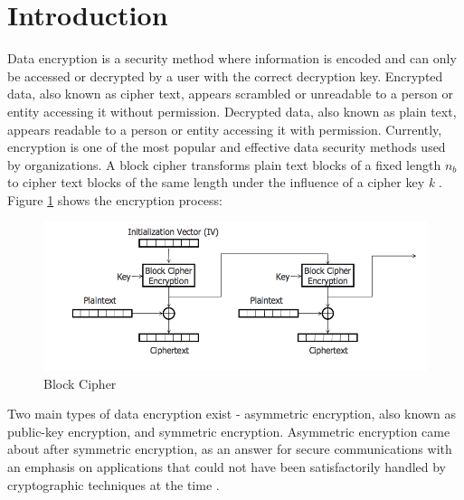 \documentclass[journal]{IEEEtran}
\begin{document}
\section{\textbf{Introduction}}
Data encryption is a security method where information is encoded and can only be accessed or decrypted by a user with the correct decryption key. Encrypted data, also known as cipher text, appears scrambled or unreadable to a person or entity accessing it without permission. Decrypted data, also known as plain text, appears readable to a person or entity accessing it with permission. Currently, encryption is one of the most popular and effective data security methods used by organizations. A block cipher transforms plain text blocks of a fixed length \textit{${n_b}$} to cipher text blocks of the same length under the influence of a cipher key \textit{k} \cite{block_cipher}. Figure \ref{fig:block_cipher} shows the encryption process:

\newline
\begin{figure}[!hb]
    \centering
    \includegraphics[scale=.3]{block_cipher}
    \caption{Block Cipher}
    \label{fig:block_cipher}
\end{figure}

Two main types of data encryption exist - asymmetric encryption, also known as public-key encryption, and symmetric encryption. Asymmetric encryption came about after symmetric encryption, as an answer for secure communications with an emphasis on applications that could not have been satisfactorily handled by cryptographic techniques at the time \cite{asymm_symm}.
\end{document}
